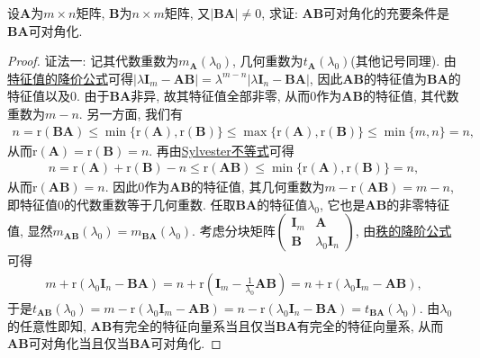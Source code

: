 \documentclass[../../main.tex]{subfiles}
\begin{document}
\begin{proposition}\label{proposition:矩阵乘积可对角化且可逆则交换后也可对角化}
设\(\boldsymbol{A}\)为\(m\times n\)矩阵, \(\boldsymbol{B}\)为\(n\times m\)矩阵, 又\(|\boldsymbol{B}\boldsymbol{A}|\neq 0\), 求证: \(\boldsymbol{A}\boldsymbol{B}\)可对角化的充要条件是\(\boldsymbol{B}\boldsymbol{A}\)可对角化.
\end{proposition}
\begin{proof}
{\color{blue}证法一:}
记其代数重数为\(m_{\boldsymbol{A}}(\lambda_0)\), 几何重数为\(t_{\boldsymbol{A}}(\lambda_0)\)(其他记号同理). 
由\hyperref[theorem:特征值的降价公式]{特征值的降价公式}可得\(|\lambda\boldsymbol{I}_m - \boldsymbol{A}\boldsymbol{B}| = \lambda^{m - n}|\lambda\boldsymbol{I}_n - \boldsymbol{B}\boldsymbol{A}|\), 因此\(\boldsymbol{A}\boldsymbol{B}\)的特征值为\(\boldsymbol{B}\boldsymbol{A}\)的特征值以及\(0\). 由于\(\boldsymbol{B}\boldsymbol{A}\)非异, 故其特征值全部非零, 从而\(0\)作为\(\boldsymbol{A}\boldsymbol{B}\)的特征值, 其代数重数为\(m - n\). 另一方面, 我们有
\begin{align*}
n = \mathrm{r}(\boldsymbol{B}\boldsymbol{A})\leqslant  \min\{\mathrm{r}(\boldsymbol{A}),\mathrm{r}(\boldsymbol{B})\}\leqslant  \max\{\mathrm{r}(\boldsymbol{A}),\mathrm{r}(\boldsymbol{B})\}\leqslant  \min\{m,n\} = n,
\end{align*}
从而\(\mathrm{r}(\boldsymbol{A}) = \mathrm{r}(\boldsymbol{B}) = n\). 再由\hyperref[proposition:Sylvester不等式]{Sylvester不等式}可得
\begin{align*}
n = \mathrm{r}(\boldsymbol{A})+\mathrm{r}(\boldsymbol{B}) - n\leqslant  \mathrm{r}(\boldsymbol{A}\boldsymbol{B})\leqslant  \min\{\mathrm{r}(\boldsymbol{A}),\mathrm{r}(\boldsymbol{B})\} = n,
\end{align*}
从而\(\mathrm{r}(\boldsymbol{A}\boldsymbol{B}) = n\). 因此\(0\)作为\(\boldsymbol{A}\boldsymbol{B}\)的特征值, 其几何重数为\(m - \mathrm{r}(\boldsymbol{A}\boldsymbol{B}) = m - n\), 即特征值\(0\)的代数重数等于几何重数. 任取\(\boldsymbol{B}\boldsymbol{A}\)的特征值\(\lambda_0\), 它也是\(\boldsymbol{A}\boldsymbol{B}\)的非零特征值, 显然\(m_{\boldsymbol{A}\boldsymbol{B}}(\lambda_0) = m_{\boldsymbol{B}\boldsymbol{A}}(\lambda_0)\). 考虑分块矩阵\(\begin{pmatrix}
\boldsymbol{I}_m&\boldsymbol{A}\\
\boldsymbol{B}&\lambda_0\boldsymbol{I}_n
\end{pmatrix}\), 由\hyperref[proposition:秩的降阶公式]{秩的降阶公式}可得
\begin{align*}
m + \mathrm{r}(\lambda_0\boldsymbol{I}_n - \boldsymbol{B}\boldsymbol{A}) = n + \mathrm{r}(\boldsymbol{I}_m - \frac{1}{\lambda_0}\boldsymbol{A}\boldsymbol{B}) = n + \mathrm{r}(\lambda_0\boldsymbol{I}_m - \boldsymbol{A}\boldsymbol{B}),
\end{align*}
于是\(t_{\boldsymbol{A}\boldsymbol{B}}(\lambda_0) = m - \mathrm{r}(\lambda_0\boldsymbol{I}_m - \boldsymbol{A}\boldsymbol{B}) = n - \mathrm{r}(\lambda_0\boldsymbol{I}_n - \boldsymbol{B}\boldsymbol{A}) = t_{\boldsymbol{B}\boldsymbol{A}}(\lambda_0)\). 由\(\lambda_0\)的任意性即知, \(\boldsymbol{A}\boldsymbol{B}\)有完全的特征向量系当且仅当\(\boldsymbol{B}\boldsymbol{A}\)有完全的特征向量系, 从而\(\boldsymbol{A}\boldsymbol{B}\)可对角化当且仅当\(\boldsymbol{B}\boldsymbol{A}\)可对角化.


\end{proof}
\end{document}
